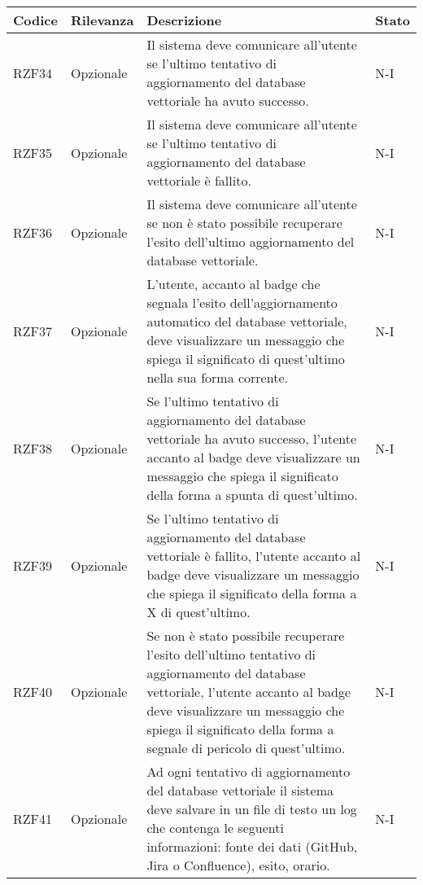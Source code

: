 \vspace{0.5cm}
\newpage
\begin{table}[h!]
    \renewcommand{\arraystretch}{1.6} %
    \begin{tabularx}{\textwidth}{|p{2cm}|p{3cm}|X|p{4cm}|} \hline
    \rowcolor[HTML]{FFD700} 
    \textbf{Codice} & \textbf{Rilevanza} & \textbf{Descrizione} & \textbf{Stato} \\ \hline
    RZF34 & Opzionale & Il sistema deve comunicare all'utente se l'ultimo tentativo di aggiornamento del database vettoriale ha avuto successo. & N-I \\ \hline
    RZF35 & Opzionale & Il sistema deve comunicare all'utente se l'ultimo tentativo di aggiornamento del database vettoriale è fallito. & N-I \\ \hline
    RZF36 & Opzionale & Il sistema deve comunicare all'utente se non è stato possibile recuperare l'esito dell'ultimo aggiornamento del database vettoriale. & N-I \\ \hline
    RZF37 & Opzionale & L'utente, accanto al badge che segnala l'esito dell'aggiornamento automatico del
    database vettoriale, deve visualizzare un messaggio che spiega il significato di quest'ultimo nella sua forma corrente. & N-I \\ \hline
    RZF38 & Opzionale & Se l'ultimo tentativo di aggiornamento del database vettoriale ha avuto successo, l'utente accanto al badge
    deve visualizzare un messaggio che spiega il significato della forma a spunta di quest'ultimo. & N-I \\ \hline
    RZF39 & Opzionale & Se l'ultimo tentativo di aggiornamento del database vettoriale è fallito, l'utente accanto al
    badge deve visualizzare un messaggio che spiega il significato della forma a X di quest'ultimo. & N-I \\ \hline
    RZF40 & Opzionale & Se non è stato possibile recuperare l'esito dell'ultimo tentativo di aggiornamento del database vettoriale,
    l'utente accanto al badge deve visualizzare un messaggio che spiega il significato della forma a segnale di pericolo di quest'ultimo. & N-I \\ \hline
    RZF41 & Opzionale & Ad ogni tentativo di aggiornamento del database vettoriale il sistema deve salvare in un file di testo un log che contenga le seguenti informazioni: 
    fonte dei dati (GitHub, Jira o Confluence), esito, orario. & N-I \\ \hline
    
    \end{tabularx}
\end{table}


